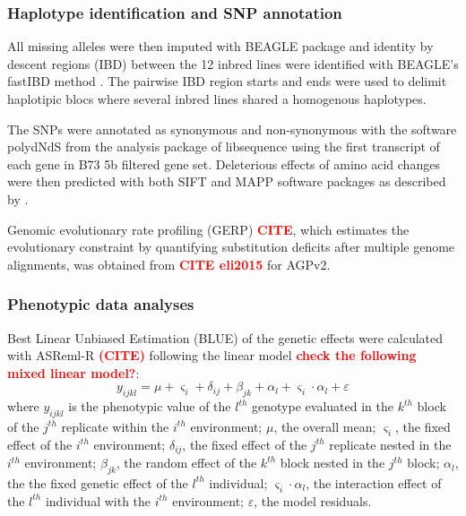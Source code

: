 \documentclass[10pt]{article}
\newcommand{\sme}[1]{\textcolor{red}{\bf #1}}
\begin{document}
\subsubsection*{Haplotype identification and SNP annotation}

All missing alleles were then imputed with BEAGLE package \citep{Browning2009} and identity by descent regions (IBD) between the 12 inbred lines were identified with BEAGLE's fastIBD method \citep{Browning2011}. The pairwise IBD region starts and ends were used to delimit haplotipic blocs where several inbred lines shared a homogenous haplotypes.%

The SNPs were annotated as synonymous and non-synonymous with the software polydNdS from the analysis package of libsequence  \citep{Thornton2003} using the first transcript of each gene in B73 5b filtered gene set. Deleterious effects of amino acid changes were then predicted with both SIFT \citep{Ng2003, Ng2006} and MAPP \citep{Stone2005} software packages as described by \citet{mezmouk2014}.

Genomic evolutionary rate profiling (GERP) \sme{CITE}, which estimates the evolutionary constraint by quantifying substitution deficits after multiple genome alignments, was obtained from \sme{CITE eli2015} for AGPv2. 



\subsubsection*{Phenotypic data analyses}

Best Linear Unbiased Estimation (BLUE) of the genetic effects were calculated with ASReml-R \sme{(CITE)} following the linear model \sme{check the following mixed linear model?}: 
%
\[y_{ijkl} = \mu + \varsigma_{i} + \delta_{ij} + \beta_{jk} + \alpha_{l} +  \varsigma_{i} \cdot \alpha_{l} + \varepsilon\]
%
where 
$y_{ijkl}$ is the phenotypic value of the $l^{th}$ genotype evaluated in the $k^{th}$ block of the $j^{th}$ replicate within the $i^{th}$ environment; 
$\mu$, the overall mean; 
$\varsigma_{i}$, the fixed effect of the $i^{th}$ environment;
$\delta_{ij}$, the fixed effect of the $j^{th}$ replicate nested in the $i^{th}$ environment; 
$\beta_{jk}$, the random effect of the $k^{th}$ block nested in the $j^{th}$ block; 
$\alpha_{l}$, the the fixed genetic effect  of the $l^{th}$ individual; 
$\varsigma_{i} \cdot \alpha_{l}$, the interaction effect of the $l^{th}$ individual with the $i^{th}$ environment; 
$\varepsilon$, the model residuals.
\end{document}
